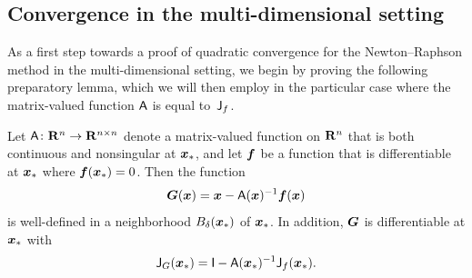 \subsection*{Convergence in the multi-dimensional setting~\moreinfo}
As a first step towards a proof of quadratic convergence for the Newton--Raphson method in the multi-dimensional setting,
we begin by proving the following preparatory lemma,
which we will then employ in the particular case where the matrix-valued function $\mathsf A$ is equal to~$\mathsf J_f$.
\begin{lemma}
    \label{lemma:lemma_newton_raphson}
    Let $\mathsf A\colon \mathbf R^n \to \mathbf R^{n \times n}$ denote a matrix-valued function on $\mathbf R^n$ that is both continuous and nonsingular at $\mathbf{\boldsymbol{x}}_*$,
    and let $\mathbf{\boldsymbol{f}}$ be a function that is differentiable at $\mathbf{\boldsymbol{x}}_*$ where $\mathbf{\boldsymbol{f}}(\mathbf{\boldsymbol{x}}_*) = 0$.
    Then the function
    \[
        \mathbf{\boldsymbol{G}}(\mathbf{\boldsymbol{x}}) = \mathbf{\boldsymbol{x}} - \mathsf A(\mathbf{\boldsymbol{x}})^{-1} \mathbf{\boldsymbol{f}}(\mathbf{\boldsymbol{x}})
    \]
    is well-defined in a neighborhood $B_{\delta}(\mathbf{\boldsymbol{x}}_*)$ of $\mathbf{\boldsymbol{x}}_*$.
    In addition, $\mathbf{\boldsymbol{G}}$ is differentiable at $\mathbf{\boldsymbol{x}}_*$ with
    \begin{align}
        \label{eq:jacobian_G}
        \mathsf J_G(\mathbf{\boldsymbol{x}}_*) = \mathsf I - \mathsf A(\mathbf{\boldsymbol{x}}_*)^{-1} \mathsf J_f(\mathbf{\boldsymbol{x}}_*).
    \end{align}
\end{lemma}
